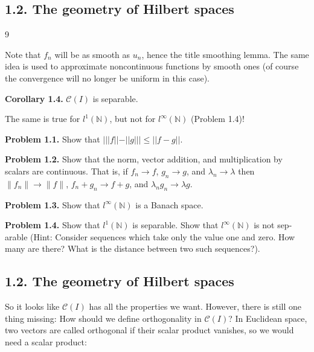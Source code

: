 \subsection*{1.2. The geometry of Hilbert spaces}
\hfill 9

Note that $f_n$ will be as smooth as $u_n$, hence the title smoothing lemma.
The same idea is used to approximate noncontinuous functions by smooth
ones (of course the convergence will no longer be uniform in this case).

\noindent\textbf{Corollary 1.4.} $\mathcal{C}(I)$ is separable.

The same is true for $l^1(\mathbb{N})$, but not for $l^\infty(\mathbb{N})$ (Problem 1.4)!

\noindent\textbf{Problem 1.1.} Show that $|||f|| - ||g||| \leq ||f - g||$.

\noindent\textbf{Problem 1.2.} Show that the norm, vector addition, and multiplication by
scalars are continuous. That is, if $f_n \to f$, $g_n \to g$, and $\lambda_n \to \lambda$ then
$\|f_n\| \to \|f\|$, $f_n + g_n \to f + g$, and $\lambda_n g_n \to \lambda g$.

\noindent\textbf{Problem 1.3.} Show that $l^\infty(\mathbb{N})$ is a Banach space.

\noindent\textbf{Problem 1.4.} Show that $l^1(\mathbb{N})$ is separable. Show that $l^\infty(\mathbb{N})$ is not sep-
arable (Hint: Consider sequences which take only the value one and zero.
How many are there? What is the distance between two such sequences?).

\subsection*{1.2. The geometry of Hilbert spaces}

So it looks like $\mathcal{C}(I)$ has all the properties we want. However, there is
still one thing missing: How should we define orthogonality in $\mathcal{C}(I)$? In
Euclidean space, two vectors are called orthogonal if their scalar product
vanishes, so we would need a scalar product:

